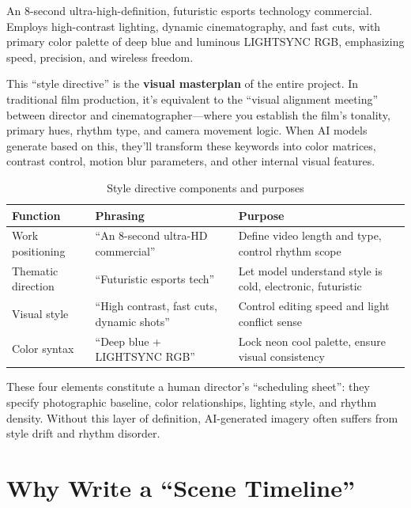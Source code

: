 An 8-second ultra-high-definition, futuristic esports technology commercial. Employs high-contrast lighting, dynamic cinematography, and fast cuts, with primary color palette of deep blue and luminous LIGHTSYNC RGB, emphasizing speed, precision, and wireless freedom.

This ``style directive'' is the \textbf{visual masterplan} of the entire project. In traditional film production, it's equivalent to the ``visual alignment meeting'' between director and cinematographer—where you establish the film's tonality, primary hues, rhythm type, and camera movement logic. When AI models generate based on this, they'll transform these keywords into color matrices, contrast control, motion blur parameters, and other internal visual features.

\begin{table}[H]
\centering
\caption{Style directive components and purposes \\ \authorillustration}
\label{tab:style-components}
\small
\begin{tabular}{p{3cm}p{5cm}p{6cm}}
\hline
\textbf{Function} & \textbf{Phrasing} & \textbf{Purpose} \\
\hline
Work positioning & ``An 8-second ultra-HD commercial'' & Define video length and type, control rhythm scope \\
Thematic direction & ``Futuristic esports tech'' & Let model understand style is cold, electronic, futuristic \\
Visual style & ``High contrast, fast cuts, dynamic shots'' & Control editing speed and light conflict sense \\
Color syntax & ``Deep blue + LIGHTSYNC RGB'' & Lock neon cool palette, ensure visual consistency \\
\hline
\end{tabular}
\end{table}

These four elements constitute a human director's ``scheduling sheet'': they specify photographic baseline, color relationships, lighting style, and rhythm density. Without this layer of definition, AI-generated imagery often suffers from style drift and rhythm disorder.

\section{Why Write a ``Scene Timeline''}
\label{sec:scene-timeline}

